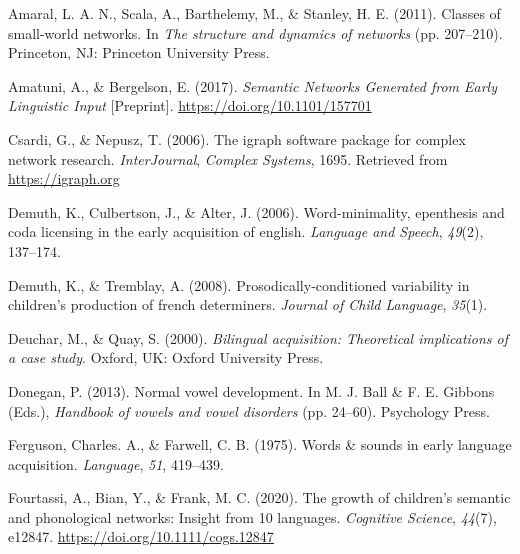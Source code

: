 \documentclass[
  man]{apa6}
\newlength{\cslhangindent}
\newlength{\cslentryspacingunit} %
\newenvironment{CSLReferences}[2] %
 {%
  \setlength{\parindent}{0pt}
  \ifodd #1
  \let\oldpar\par
  \def\par{\hangindent=\cslhangindent\oldpar}
  \fi
  \setlength{\parskip}{#2\cslentryspacingunit}
 }%
 {}
\begin{document}
\hypertarget{refs}{}
\begin{CSLReferences}{1}{0}
\leavevmode{}%
Amaral, L. A. N., Scala, A., Barthelemy, M., \& Stanley, H. E. (2011). Classes of small-world networks. In \emph{The structure and dynamics of networks} (pp. 207--210). Princeton, {NJ}: Princeton University Press.

\leavevmode{}%
Amatuni, A., \& Bergelson, E. (2017). \emph{Semantic {Networks} {Generated} from {Early} {Linguistic} {Input}} {[}Preprint{]}. \url{https://doi.org/10.1101/157701}

\leavevmode{}%
Csardi, G., \& Nepusz, T. (2006). The igraph software package for complex network research. \emph{InterJournal}, \emph{Complex Systems}, 1695. Retrieved from \url{https://igraph.org}

\leavevmode{}%
Demuth, K., Culbertson, J., \& Alter, J. (2006). Word-minimality, epenthesis and coda licensing in the early acquisition of english. \emph{Language and Speech}, \emph{49}(2), 137--174.

\leavevmode{}%
Demuth, K., \& Tremblay, A. (2008). Prosodically-conditioned variability in children's production of french determiners. \emph{Journal of Child Language}, \emph{35}(1).

\leavevmode{}%
Deuchar, M., \& Quay, S. (2000). \emph{Bilingual acquisition: Theoretical implications of a case study}. Oxford, {UK}: Oxford University Press.

\leavevmode{}%
Donegan, P. (2013). Normal vowel development. In M. J. Ball \& F. E. Gibbons (Eds.), \emph{Handbook of vowels and vowel disorders} (pp. 24--60). Psychology Press.

\leavevmode{}%
Ferguson, Charles. A., \& Farwell, C. B. (1975). Words \& sounds in early language acquisition. \emph{Language}, \emph{51}, 419--439.

\leavevmode{}%
Fourtassi, A., Bian, Y., \& Frank, M. C. (2020). The growth of children's semantic and phonological networks: Insight from 10 languages. \emph{Cognitive Science}, \emph{44}(7), e12847. \url{https://doi.org/10.1111/cogs.12847}


\end{CSLReferences}
\end{document}
